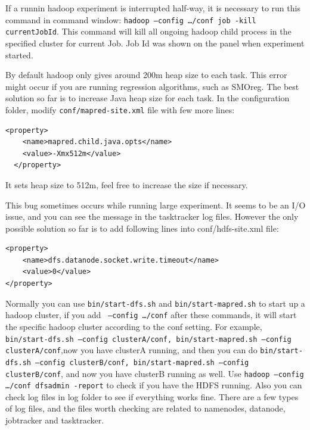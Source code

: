 \documentclass[a4paper]{book}
\begin{document}
\noindent If a runnin hadoop experiment is interrupted half-way, it is necessary
to run this command in command window: \texttt{hadoop --config \ldots/conf job -kill currentJobId}.
This command will kill all ongoing hadoop child process in the specified
cluster for current Job. Job Id was shown on the panel when experiment
started.


\noindent By default hadoop only gives around 200m heap size to each task. This
error might occur if you are running regression algorithms, such as SMOreg. The best
solution so far is to increase Java heap size for each task. In the
configuration folder, modify \texttt{conf/mapred-site.xml} file with few more
lines:
\begin{verbatim}
<property>
    <name>mapred.child.java.opts</name>
    <value>-Xmx512m</value>
  </property>
\end{verbatim}

\noindent It sets heap size to 512m, feel free to increase the size if
necessary.


\noindent This bug sometimes occurs while running large experiment. It seems to
be an I/O issue, and you can see the message in the tasktracker log files. However the
only possible solution so far is to add following lines into conf/hdfs-site.xml
file:
\begin{verbatim}
<property>
    <name>dfs.datanode.socket.write.timeout</name>
    <value>0</value>
</property>
\end{verbatim}



\noindent Normally you can use \texttt{bin/start-dfs.sh} and
\texttt{bin/start-mapred.sh} to start up a hadoop cluster, if you add \texttt{ --config \ldots/conf} after these
commands, it will start the specific hadoop cluster according to the conf setting. For example,
\texttt{bin/start-dfs.sh --config clusterA/conf, bin/start-mapred.sh --config
clusterA/conf},now you have clusterA running, and then you can do
\texttt{bin/start-dfs.sh --config clusterB/conf, bin/start-mapred.sh --config
clusterB/conf}, and now you have clusterB running as well. Use \texttt{hadoop
--config \ldots/conf dfsadmin -report} to check if you have the HDFS running.
Also you can check log files in log folder to see if everything works fine.
There are a few types of log files, and the files worth checking are related to
namenodes, datanode, jobtracker and tasktracker.
\end{document}
